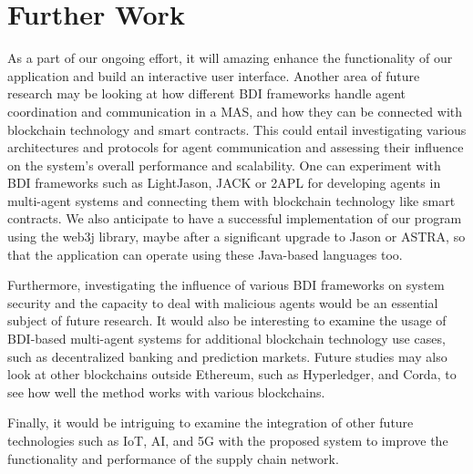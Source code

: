 {\chapter{Further Work}}
As a part of our ongoing effort, it will amazing enhance the functionality of our application and build an interactive user interface. Another area of future research may be looking at how different \ac{BDI} frameworks handle agent coordination and communication in a \ac{MAS}, and how they can be connected with blockchain technology and smart contracts. This could entail investigating various architectures and protocols for agent communication and assessing their influence on the system's overall performance and scalability. One can experiment with \ac{BDI} frameworks such as LightJason, JACK or 2APL for developing agents in multi-agent systems and connecting them with blockchain technology like smart contracts. We also anticipate to have a successful implementation of our program using the web3j library, maybe after a significant upgrade to Jason or ASTRA, so that the application can operate using these Java-based languages too.

\vspace{.5cm}

Furthermore, investigating the influence of various \ac{BDI} frameworks on system security and the capacity to deal with malicious agents would be an essential subject of future research. It would also be interesting to examine the usage of \ac{BDI}-based multi-agent systems for additional blockchain technology use cases, such as decentralized banking and prediction markets. Future studies may also look at other blockchains outside Ethereum, such as Hyperledger, and Corda, to see how well the method works with various blockchains.

\vspace{.5cm}

Finally, it would be intriguing to examine the integration of other future technologies such as \ac{IoT}, \ac{AI}, and 5G with the proposed system to improve the functionality and performance of the supply chain network.